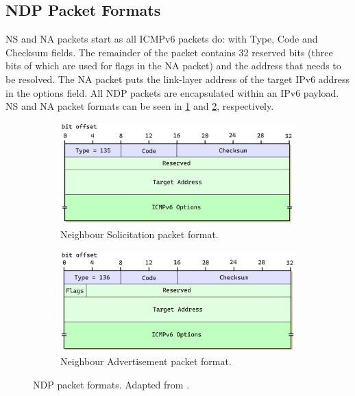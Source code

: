 \subsection{NDP Packet Formats}
\label{sec:3.6.1}

NS and NA packets start as all ICMPv6 packets do: with Type, Code and Checksum fields. The remainder of the packet contains 32 reserved bits (three bits of which are used for flags in the NA packet) and the address that needs to be resolved. The NA packet puts the link-layer address of the target IPv6 address in the options field. All NDP packets are encapsulated within an IPv6 payload. NS and NA packet formats can be seen in \cref{fig:impl-ndpsolheader} and \cref{fig:impl-ndpadvheader}, respectively.

\begin{figure}[htbp]
\centering
\begin{subfigure}{.5\textwidth}
  \centering
  \includegraphics[width=1\linewidth]{figures/implementation/ndp_sol.png}
  \caption{Neighbour Solicitation packet format.}
  \label{fig:impl-ndpsolheader}
\end{subfigure}%
\begin{subfigure}{.5\textwidth}
  \centering
  \includegraphics[width=1\linewidth]{figures/implementation/ndp_adv.png}
  \caption{Neighbour Advertisement packet format.}
  \label{fig:impl-ndpadvheader}
\end{subfigure}
\caption{NDP packet formats. Adapted from \cite{IPguide}.}
\label{fig:impl-ndpmsgs}
\end{figure}



